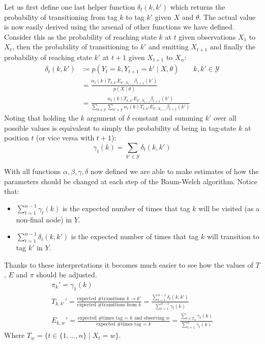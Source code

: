 \documentclass[../main.tex]{subfiles}
\begin{document}
Let us first define one last helper function $\delta_t(k, k')$ which returns the probability of transitioning from tag $k$ to tag $k'$ given $X$ and $\theta$. The actual value is now easily derived using the arsenal of other functions we have defined. Consider this as the probability of reaching state $k$ at $t$ given observations $X_1$ to $X_t$, then the probability of transitioning to $k'$ and emitting $X_{t+1}$ and finally the probability of reaching state $k'$ at $t+1$ given $X_{t+1}$ to $X_n$:
\begin{align*}
    \delta_t(k, k') &\coloneqq p(Y_t = k, Y_{t+1} = k' \mid X, \theta) \qquad k,k' \in \mathcal{Y} \\
    &= \frac{\alpha_t(k)T_{k,k'}E_{k',X_{t+1}}\beta_{t+1}(k')}{p(X \mid \theta)} \\
    &= \frac{\alpha_t(k)T_{k,k'}E_{k',X_{t+1}}\beta_{t+1}(k')}{\sum_{k \in \mathcal{Y}} \sum_{k' \in \mathcal{Y}} \alpha_t(k)T_{k,k'}E_{k',X_{t+1}}\beta_{t+1}(k')}
\end{align*}
Noting that holding the $k$ argument of $\delta$ constant and summing $k'$ over all possible values is equivalent to simply the probability of being in tag-state $k$ at position $t$ (or vice versa with $t+1$):
\begin{equation*}
    \gamma_t(k) = \sum_{k' \in \mathcal{Y}} \delta_t(k,k')
\end{equation*}

With all functions $\alpha, \beta, \gamma, \delta$ now defined we are able to make estimates of how the parameters should be changed at each step of the Baum-Welch algorithm.
Notice that:
\begin{itemize}
    \item $\sum_{t=1}^{n-1} \gamma_t(k)$ is the expected number of times that tag $k$ will be visited (as a non-final node) in $Y$.
    \item $\sum_{t=1}^{n-1} \delta_t(k, k')$ is the expected number of times that tag $k$ will transition to tag $k'$ in $Y$.
\end{itemize}
Thanks to these interpretations it becomes much easier to see how the values of $T$, $E$ and $\pi$ should be adjusted.
\begin{gather*}
    \pi_k ' = \gamma_1(k) \\
    T_{k,k'}' = \frac{\text{expected \# transitions $k \rightarrow k'$}}{\text{expected \# transitions from $k$}} = \frac{\sum_{t=1}^{n-1} \delta_t(k, k')}{\sum_{t=1}^{n-1} \gamma_t(k)} \\
    E_{k,w}' = \frac{\text{expected \# times tag = $k$ and observing $w$}}{\text{expected \# times tag = $k$}} = \frac{\sum_{t \in T_w} \gamma_t(k)}{\sum_{t=1}^{n} \gamma_t(k)}
\end{gather*}
Where $T_w = \{t \in \{1,\ldots,n\} \mid X_t = w\}$.
\end{document}
